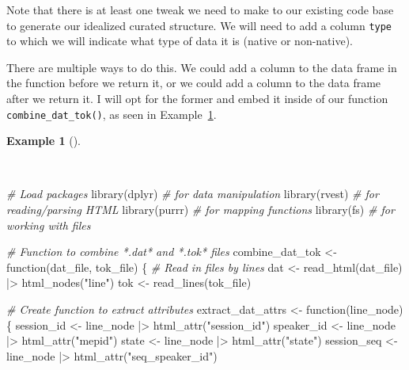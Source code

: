 \documentclass[
  letterpaper,
  DIV=11,
  numbers=noendperiod]{scrreprt}
\newenvironment{Shaded}{\begin{snugshade}}{\end{snugshade}}
\newcommand{\CommentTok}[1]{\textcolor[rgb]{0.00,0.00,0.00}{\textit{#1}}}
\newcommand{\ControlFlowTok}[1]{\textcolor[rgb]{0.00,0.00,0.00}{#1}}
\newcommand{\FunctionTok}[1]{\textcolor[rgb]{0.00,0.00,0.00}{#1}}
\newcommand{\NormalTok}[1]{\textcolor[rgb]{0.00,0.00,0.00}{#1}}
\newcommand{\OtherTok}[1]{\textcolor[rgb]{0.00,0.00,0.00}{#1}}
\newcommand{\SpecialCharTok}[1]{\textcolor[rgb]{0.00,0.00,0.00}{#1}}
\newcommand{\StringTok}[1]{\textcolor[rgb]{0.00,0.00,0.00}{#1}}
\theoremstyle{definition}
\newtheorem{example}{Example}[chapter]
\theoremstyle{remark}
\begin{document}
Note that there is at least one tweak we need to make to our existing
code base to generate our idealized curated structure. We will need to
add a column \texttt{type} to which we will indicate what type of data
it is (native or non-native).

There are multiple ways to do this. We could add a column to the data
frame in the function before we return it, or we could add a column to
the data frame after we return it. I will opt for the former and embed
it inside of our function \texttt{combine\_dat\_tok()}, as seen in
Example~\ref{exm-cd-enntt-combine-dat-tok-function}.

\begin{example}[]\protect\hypertarget{exm-cd-enntt-combine-dat-tok-function}{}\label{exm-cd-enntt-combine-dat-tok-function}

~

\begin{Shaded}
\begin{Highlighting}[]
\CommentTok{\# Load packages}
\FunctionTok{library}\NormalTok{(dplyr) }\CommentTok{\# for data manipulation}
\FunctionTok{library}\NormalTok{(rvest) }\CommentTok{\# for reading/parsing HTML}
\FunctionTok{library}\NormalTok{(purrr) }\CommentTok{\# for mapping functions}
\FunctionTok{library}\NormalTok{(fs) }\CommentTok{\# for working with files}

\CommentTok{\# Function to combine *.dat* and *.tok* files}
\NormalTok{combine\_dat\_tok }\OtherTok{\textless{}{-}} \ControlFlowTok{function}\NormalTok{(dat\_file, tok\_file) \{}
  \CommentTok{\# Read in files by lines}
\NormalTok{  dat }\OtherTok{\textless{}{-}}
    \FunctionTok{read\_html}\NormalTok{(dat\_file) }\SpecialCharTok{|\textgreater{}}
    \FunctionTok{html\_nodes}\NormalTok{(}\StringTok{"line"}\NormalTok{)}
\NormalTok{  tok }\OtherTok{\textless{}{-}} \FunctionTok{read\_lines}\NormalTok{(tok\_file)}

  \CommentTok{\# Create function to extract attributes}
\NormalTok{  extract\_dat\_attrs }\OtherTok{\textless{}{-}} \ControlFlowTok{function}\NormalTok{(line\_node) \{}
\NormalTok{    session\_id }\OtherTok{\textless{}{-}}\NormalTok{ line\_node }\SpecialCharTok{|\textgreater{}} \FunctionTok{html\_attr}\NormalTok{(}\StringTok{"session\_id"}\NormalTok{)}
\NormalTok{    speaker\_id }\OtherTok{\textless{}{-}}\NormalTok{ line\_node }\SpecialCharTok{|\textgreater{}} \FunctionTok{html\_attr}\NormalTok{(}\StringTok{"mepid"}\NormalTok{)}
\NormalTok{    state }\OtherTok{\textless{}{-}}\NormalTok{ line\_node }\SpecialCharTok{|\textgreater{}} \FunctionTok{html\_attr}\NormalTok{(}\StringTok{"state"}\NormalTok{)}
\NormalTok{    session\_seq }\OtherTok{\textless{}{-}}\NormalTok{ line\_node }\SpecialCharTok{|\textgreater{}} \FunctionTok{html\_attr}\NormalTok{(}\StringTok{"seq\_speaker\_id"}\NormalTok{)}


\end{Highlighting}
\end{Shaded}
\end{example}
\end{document}
